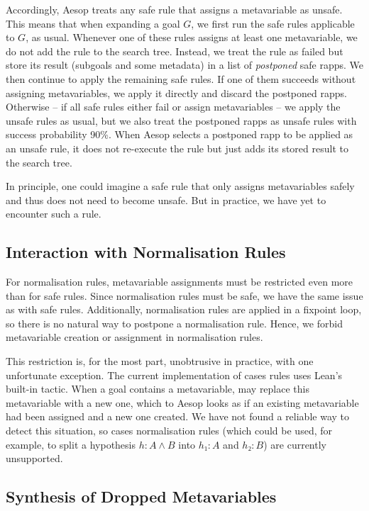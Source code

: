 Accordingly, Aesop treats any safe rule that assigns a metavariable as unsafe.
This means that when expanding a goal $G$, we first run the safe rules applicable to $G$, as usual.
Whenever one of these rules assigns at least one metavariable, we do not add the rule to the search tree.
Instead, we treat the rule as failed but store its result (subgoals and some metadata) in a list of \emph{postponed} safe rapps.
We then continue to apply the remaining safe rules.
If one of them succeeds without assigning metavariables, we apply it directly and discard the postponed rapps.
Otherwise -- if all safe rules either fail or assign metavariables -- we apply the unsafe rules as usual, but we also treat the postponed rapps as unsafe rules with success probability 90\%.
When Aesop selects a postponed rapp to be applied as an unsafe rule, it does not re-execute the rule but just adds its stored result to the search tree.

In principle, one could imagine a safe rule that only assigns metavariables safely and thus does not need to become unsafe.
But in practice, we have yet to encounter such a rule.


\subsection{Interaction with Normalisation Rules}%
\label{sec:aesop:mvars-norm}

For normalisation rules, metavariable assignments must be restricted even more than for safe rules.
Since normalisation rules must be safe, we have the same issue as with safe rules.
Additionally, normalisation rules are applied in a fixpoint loop, so there is no natural way to postpone a normalisation rule.
Hence, we forbid metavariable creation or assignment in normalisation rules.

This restriction is, for the most part, unobtrusive in practice, with one unfortunate exception.
The current implementation of cases rules uses Lean's built-in  tactic.
When a goal contains a metavariable,  may replace this metavariable with a new one, which to Aesop looks as if an existing metavariable had been assigned and a new one created.
We have not found a reliable way to detect this situation, so cases normalisation rules (which could be used, for example, to split a hypothesis $h : A ∧ B$ into $h₁ : A$ and $h₂ : B$) are currently unsupported.


\subsection{Synthesis of Dropped Metavariables}%
\label{sec:aesop:mvars-dropped}

